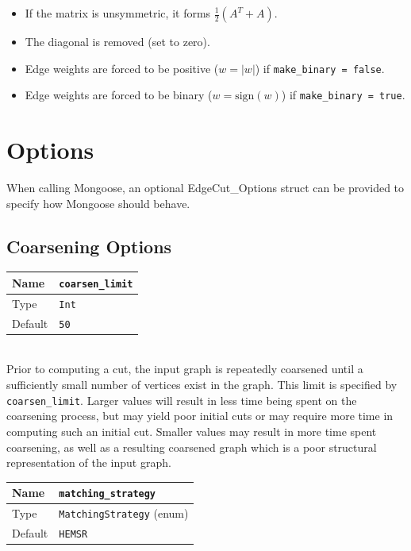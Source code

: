 \documentclass[letter]{article}
\begin{document}
\begin{itemize}
\begin{itemize}
\item If the matrix is unsymmetric, it forms $\frac{1}{2}(A^T + A)$.
\item The diagonal is removed (set to zero).
\item Edge weights are forced to be positive ($w = |w|$) if \texttt{make\_binary = false}.
\item Edge weights are forced to be binary ($w = \text{sign}(w)$) if \texttt{make\_binary = true}.
\end{itemize}

\end{itemize}

\section{Options}
\label{sec:options}

When calling Mongoose, an optional EdgeCut\_Options struct can be provided to specify how Mongoose should behave.

\subsection{Coarsening Options}

\begin{tabular}{|l|l|} \hline
Name & \texttt{coarsen\_limit} \\ \hline
Type & \texttt{Int} \\ \hline
Default & \texttt{50} \\ \hline
\end{tabular}\\

Prior to computing a cut, the input graph is repeatedly coarsened until a sufficiently small number of vertices exist in the graph. This limit is specified by \texttt{coarsen\_limit}. Larger values will result in less time being spent on the coarsening process, but may yield poor initial cuts or may require more time in computing such an initial cut. Smaller values may result in more time spent coarsening, as well as a resulting coarsened graph which is a poor structural representation of the input graph.

\baselineskip
\begin{tabular}{|l|l|} \hline
Name & \texttt{matching\_strategy} \\ \hline
Type & \texttt{MatchingStrategy} (enum) \\ \hline
Default & \texttt{HEMSR} \\ \hline
\end{tabular}\\
\end{document}
